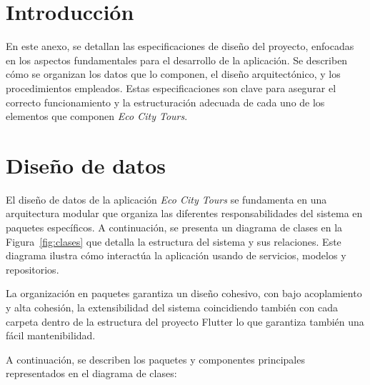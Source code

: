 
\section{Introducción}
En este anexo, se detallan las especificaciones de diseño del proyecto, enfocadas en los aspectos fundamentales para el desarrollo de la aplicación. Se describen cómo se organizan los datos que lo componen, el diseño arquitectónico, y los procedimientos empleados. Estas especificaciones son clave para asegurar el correcto funcionamiento y la estructuración adecuada de cada uno de los elementos que componen \textit{Eco City Tours}.
\section{Diseño de datos}

El diseño de datos de la aplicación \textit{Eco City Tours} se fundamenta en una arquitectura modular que organiza las diferentes responsabilidades del sistema en paquetes específicos. A continuación, se presenta un diagrama de clases en la Figura~\ref{fig:clases} que detalla la estructura del sistema y sus relaciones. Este diagrama ilustra cómo interactúa la aplicación usando de servicios, modelos y repositorios.

La organización en paquetes garantiza un diseño cohesivo, con bajo acoplamiento y alta cohesión, la extensibilidad del sistema coincidiendo también con cada carpeta dentro de la estructura del proyecto Flutter lo que garantiza también una fácil mantenibilidad.


A continuación, se describen los paquetes y componentes principales representados en el diagrama de clases:

